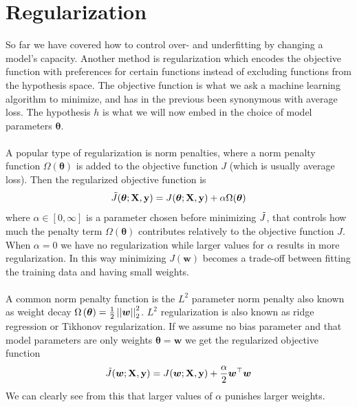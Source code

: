 \section{Regularization}\label{sec:regularization}
So far we have covered how to control over- and underfitting by changing a model's capacity. Another method is regularization which encodes the objective function with preferences for certain functions instead of excluding functions from the hypothesis space. The objective function is what we ask a machine learning algorithm to minimize, and has in the previous been synonymous with average loss. The hypothesis $h$ is what we will now embed in the choice of model parameters $\boldsymbol{\theta}$.\\
\\
A popular type of regularization is norm penalties, where a norm penalty function $\Omega(\boldsymbol{\theta})$ is added to the objective function  $J$ (which is usually average loss). Then the regularized objective function is
\begin{equation} \label{eq:reg_obj_func}
    \Tilde{J}(\boldsymbol{\theta}; \mathbf{X}, \mathbf{y}) = J(\boldsymbol{\theta}; \mathbf{X}, \mathbf{y}) + \alpha \Omega(\boldsymbol{\theta})
\end{equation}
where $\alpha \in [0, \infty]$ is a parameter chosen before minimizing $\Tilde{J}$, that controls how much the penalty term $ \Omega(\boldsymbol{\theta})$ contributes relatively to the objective function $J$. When $\alpha=0$ we have no regularization while larger values for $\alpha$ results in more regularization. In this way minimizing $J(\mathbf{w})$ becomes a trade-off between fitting the training data and having small weights.\\
\\
A common norm penalty function is the $L^2$ parameter norm penalty also known as weight decay $\Omega \left (\boldsymbol{\theta}\right) = \frac{1}{2} \left |\left |\boldsymbol{w}\right|\right|_2^2$. $L^2$ regularization is also known as ridge regression or Tikhonov regularization. If we assume no bias parameter and that model parameters are only weights $\boldsymbol{\theta} = \boldsymbol{w}$ we get the regularized objective function
\begin{equation} \label{eq:L2_reg}
    \Tilde{J}(\boldsymbol{w}; \mathbf{X}, \mathbf{y}) = J(\boldsymbol{w}; \mathbf{X}, \mathbf{y}) + \frac{\alpha}{2} \boldsymbol{w}^\top \boldsymbol{w}
\end{equation}
We can clearly see from this that larger values of $\alpha$ punishes larger weights. \\
